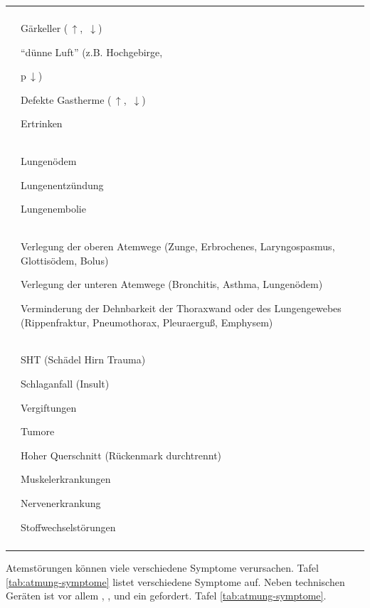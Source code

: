 \begin{table}[H]
\begin{gWideParEnv}

\begin{tabulary}{\linewidth}[H]{LL}
  & 
\\\addlinespace\midrule\addlinespace
{}
 &
Gärkeller (\,${\uparrow}$, \,${\downarrow}$)

"`dünne Luft"' (z.B. Hochgebirge,

p\,${\downarrow}$)

Defekte Gastherme (\,${\uparrow}$,
\,${\downarrow}$)

Ertrinken
\\\addlinespace
{}
 &
Lungenödem

Lungenentzündung

Lungenembolie
\\\addlinespace
{}
 &
Verlegung der oberen Atemwege (Zunge, Erbrochenes, Laryngospasmus,
         Glottisödem, Bolus)

Verlegung der unteren Atemwege (Bronchitis, Asthma,
Lungenödem)

Verminderung der Dehnbarkeit der Thoraxwand oder des Lungengewebes
     (Rippenfraktur, Pneumothorax, Pleuraerguß, Emphysem)
\\\addlinespace
{}
 &
SHT (Schädel Hirn Trauma)

Schlaganfall (Insult)

Vergiftungen

Tumore

Hoher Querschnitt (Rückenmark durchtrennt)

Muskelerkrankungen

Nervenerkrankung

Stoffwechselstörungen
\\\addlinespace\bottomrule
\end{tabulary}
\end{gWideParEnv}
\end{table}


{
Atemstörungen können viele verschiedene Symptome verursachen. Tafel
\ref{tab:atmung-symptome} listet verschiedene Symptome auf. Neben technischen
Geräten ist vor allem , ,  und ein
 gefordert.
}{Tafel \ref{tab:atmung-symptome}.}{}{}{}


